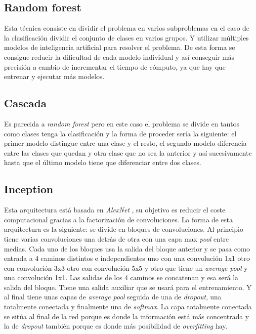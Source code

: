 \documentclass[12pt,a4paper]{article}
\begin{document}
\subsection{Random forest}
Esta técnica consiste en dividir el problema en varios subproblemas \cite{wiki:rf} en el caso de la clasificación dividir el conjunto de clases en varios grupos. Y utilizar múltiples modelos de inteligencia artificial para resolver el problema. De esta forma se consigue reducir la dificultad de cada modelo individual y así conseguir más precisión a cambio de incrementar el tiempo de cómputo, ya que hay que entrenar y ejecutar más modelos.

\subsection{Cascada}
Es parecida a \textit{random forest} pero en este caso \cite{wiki:cc} el problema se divide en tantos como clases tenga la clasificación y la forma de proceder sería la siguiente: el primer modelo distingue entre una clase y el resto, el segundo modelo diferencia entre las clases que quedan y otra clase que no sea la anterior y así sucesivamente hasta que el último modelo tiene que diferenciar entre dos clases.

\subsection{Inception}
Esta arquitectura está basada en \textit{AlexNet} \cite{DBLP:journals/corr/SzegedyVISW15}, su objetivo es reducir el coste computacional gracias a la factorización de convoluciones. La forma \cite{iv3m} \cite{inceptiongh} de esta arquitectura es la siguiente: se divide en bloques de convoluciones. Al principio tiene varias convoluciones una detrás de otra con una capa max \textit{pool} entre medias. Cada uno de los bloques usa la salida del bloque anterior y se pasa como entrada a 4 caminos distintos e independientes uno con una convolución 1x1 otro con convolución 3x3 otro con convolución 5x5 y otro que tiene un \textit{average pool} y una convolución 1x1. Las salidas de los 4 caminos se concatenan y esa será la salida del bloque. Tiene una salida auxiliar que se usará para el entrenamiento. Y al final tiene unas capas de \textit{average pool} seguida de una de \textit{dropout}, una totalmente conectada y finalmente una de \textit{softmax}. La capa totalmente conectada se sitúa al final de la red porque es donde la información está más concentrada y la de \textit{dropout} también porque es donde más posibilidad de \textit{overfitting} hay.
\end{document}
